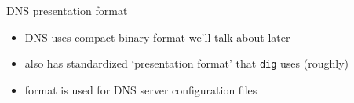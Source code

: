\begin{frame}{DNS presentation format}
    \begin{itemize}
    \item DNS uses compact binary format we'll talk about later
    \vspace{.5cm}
    \item also has standardized `presentation format' that \texttt{dig} uses (roughly)
    \item format is used for DNS server configuration files
    \end{itemize}
\end{frame}
